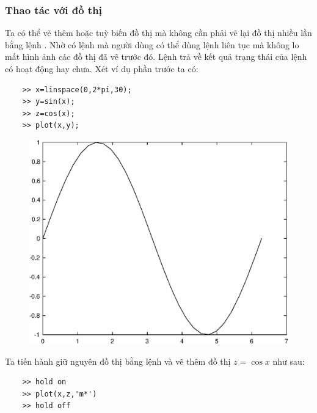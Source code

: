 \documentclass[12pt,a4paper]{article}
\begin{document}
\subsubsection{Thao tác với đồ thị}
Ta có thể vẽ thêm hoặc tuỳ biến đồ thị mà không cần phải vẽ lại đồ thị nhiều lần bằng lệnh . Nhờ có lệnh  mà người dùng có thể dùng lệnh  liên tục mà không lo mất hình ảnh các đồ thị đã vẽ trước đó. Lệnh  trả về kết quả trạng thái của lệnh  có hoạt động hay chưa. Xét ví dụ phần trước ta có:
\begin{lstlisting}
	>> x=linspace(0,2*pi,30);
	>> y=sin(x);
	>> z=cos(x);
	>> plot(x,y);
\end{lstlisting}
\begin{center}
	\begin{figure}[H]
	\begin{center}
		\includegraphics[scale=0.6]{hinhtieuluan/dothi1}
	\end{center}
		\caption{}
		\label{refdothi1}
	\end{figure}
\end{center}
Ta tiến hành giữ nguyên đồ thị bằng lệnh  và vẽ thêm đồ thị $z=\cos{x}$ như sau:
\begin{lstlisting}
	>> hold on
	>> plot(x,z,'m*')
	>> hold off
\end{lstlisting}
\end{document}
